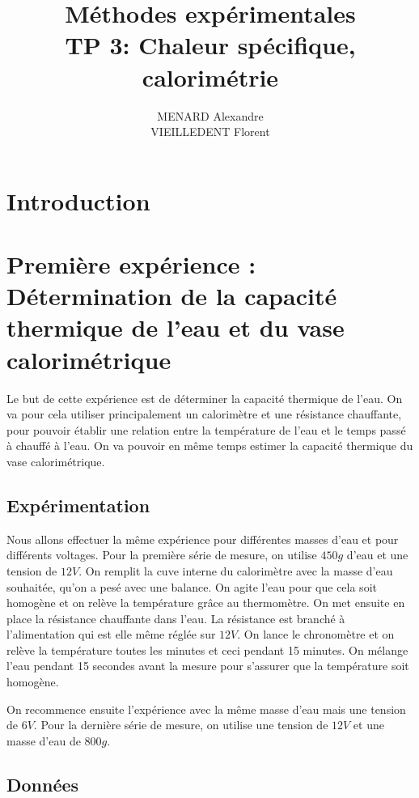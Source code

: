 \documentclass[12pt]{article}
\title{\textbf{Méthodes expérimentales} \\ TP 3: Chaleur spécifique, calorimétrie}
\author{MENARD Alexandre \\ VIEILLEDENT Florent}
\begin{document}
\maketitle

\section*{Introduction}


\newpage

\section{Première expérience : Détermination de la capacité thermique de l'eau et du vase calorimétrique}

Le but de cette expérience est de déterminer la capacité thermique de l'eau. On va pour cela utiliser principalement un calorimètre et une résistance chauffante, pour pouvoir établir une relation entre la température de l'eau et le temps passé à chauffé à l'eau. On va pouvoir en même temps estimer la capacité thermique du vase calorimétrique. 

\subsection{Expérimentation}

Nous allons effectuer la même expérience pour différentes masses d'eau et pour différents voltages. Pour la première série de mesure, on utilise $450g$ d'eau et une tension de $12V$. On remplit la cuve interne du calorimètre avec la masse d'eau souhaitée, qu'on a pesé avec une balance. On agite l'eau pour que cela soit homogène et on relève la température grâce au thermomètre. On met ensuite en place la résistance chauffante dans l'eau. La résistance est branché à l'alimentation qui est elle même réglée sur $12V$. On lance le chronomètre et on relève la température toutes les minutes et ceci pendant 15 minutes. On mélange l'eau pendant 15 secondes avant la mesure pour s'assurer que la température soit homogène. 

On recommence ensuite l'expérience avec la même masse d'eau mais une tension de $6V$. Pour la dernière série de mesure, on utilise une tension de $12V$ et une masse d'eau de $800g$.

\subsection{Données}
\end{document}
